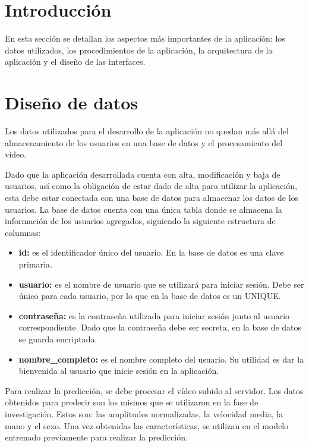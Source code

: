 
\section{Introducción}
En esta sección se detallan los aspectos más importantes de la aplicación: los datos utilizados, los procedimientos de la aplicación, la arquitectura de la aplicación y el diseño de las interfaces.

\section{Diseño de datos} \label{datos}
Los datos utilizados para el desarrollo de la aplicación no quedan más allá del almacenamiento de los usuarios en una base de datos y el procesamiento del vídeo.

Dado que la aplicación desarrollada cuenta con alta, modificación y baja de usuarios, así como la obligación de estar dado de alta para utilizar la aplicación, esta debe estar conectada con una base de datos para almacenar los datos de los usuarios. La base de datos cuenta con una única tabla donde se almacena la información de los usuarios agregados, siguiendo la siguiente estructura de columnas:

\begin{itemize}
	\item \textbf{id:} es el identificador único del usuario. En la base de datos es una clave primaria.
	\item \textbf{usuario:} es el nombre de usuario que se utilizará para iniciar sesión. Debe ser único para cada usuario, por lo que en la base de datos es un UNIQUE.
	\item \textbf{contraseña:} es la contraseña utilizada para iniciar sesión junto al usuario correspondiente. Dado que la contraseña debe ser secreta, en la base de datos se guarda encriptada.
	\item \textbf{nombre\_completo:} es el nombre completo del usuario. Su utilidad es dar la bienvenida al usuario que inicie sesión en la aplicación.
\end{itemize}

Para realizar la predicción, se debe procesar el vídeo subido al servidor. Los datos obtenidos para predecir son los mismos que se utilizaron en la fase de investigación. Estos son: las amplitudes normalizadas, la velocidad media, la mano y el sexo. Una vez obtenidas las características, se utilizan en el modelo entrenado previamente para realizar la predicción.

